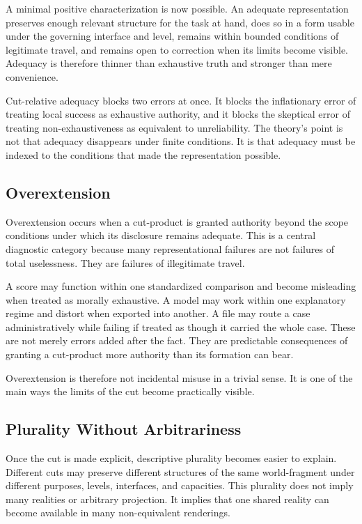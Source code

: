 \documentclass[11pt]{article}
\begin{document}
A minimal positive characterization is now possible. An adequate representation preserves enough relevant structure for the task at hand, does so in a form usable under the governing interface and level, remains within bounded conditions of legitimate travel, and remains open to correction when its limits become visible. Adequacy is therefore thinner than exhaustive truth and stronger than mere convenience.

Cut-relative adequacy blocks two errors at once. It blocks the inflationary error of treating local success as exhaustive authority, and it blocks the skeptical error of treating non-exhaustiveness as equivalent to unreliability. The theory's point is not that adequacy disappears under finite conditions. It is that adequacy must be indexed to the conditions that made the representation possible.

\subsection{Overextension}

Overextension occurs when a cut-product is granted authority beyond the scope conditions under which its disclosure remains adequate. This is a central diagnostic category because many representational failures are not failures of total uselessness. They are failures of illegitimate travel.

A score may function within one standardized comparison and become misleading when treated as morally exhaustive. A model may work within one explanatory regime and distort when exported into another. A file may route a case administratively while failing if treated as though it carried the whole case. These are not merely errors added after the fact. They are predictable consequences of granting a cut-product more authority than its formation can bear.

Overextension is therefore not incidental misuse in a trivial sense. It is one of the main ways the limits of the cut become practically visible.

\subsection{Plurality Without Arbitrariness}

Once the cut is made explicit, descriptive plurality becomes easier to explain. Different cuts may preserve different structures of the same world-fragment under different purposes, levels, interfaces, and capacities. This plurality does not imply many realities or arbitrary projection. It implies that one shared reality can become available in many non-equivalent renderings.
\end{document}
